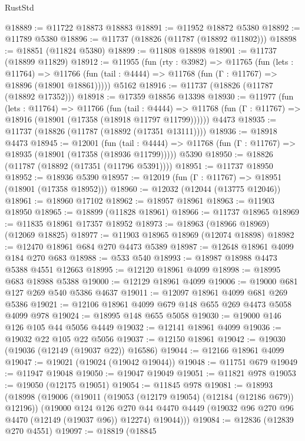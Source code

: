 \begin{lexlean}{RustStd}
\begin{coremodule}
@18889 := @11722 @18873 @18883
@18891 := @11952 @18872 @5380
@18892 := @11789 @5380
@18896 := @11737 (@18826 (@11787 (@18892 @11802)))
@18898 := @18851 (@11824 @5380)
@18899 := @11808 @18898
@18901 := @11737 (@18899 @11829)
@18912 := @11955
    (fun (rty : @3982) =>
    @11765
      (fun (lets : @11764) =>
      @11766 (fun (tail : @4444) => @11768 (fun (Γ : @11767) => @18896 (@18901 @18861)))))
    @5162
@18916 := @11737 (@18826 (@11787 (@18892 @17352)))
@18918 := @17359 @18856 @13398
@18930 := @11977
    (fun (lets : @11764) =>
    @11766
      (fun (tail : @4444) =>
      @11768 (fun (Γ : @11767) => @18916 (@18901 (@17358 (@18918 @11797 @11799))))))
    @4473
@18935 := @11737 (@18826 (@11787 (@18892 (@17351 @13111))))
@18936 := @18918 @4473
@18945 := @12001
    (fun (tail : @4444) => @11768 (fun (Γ : @11767) => @18935 (@18901 (@17358 (@18936 @11799)))))
    @5390
@18950 := @18826 (@11787 (@18892 (@17351 (@11796 @5391))))
@18951 := @11737 @18950
@18952 := @18936 @5390
@18957 := @12019 (fun (Γ : @11767) => @18951 (@18901 (@17358 @18952)))
@18960 := @12032 (@12044 (@13775 @12046))
@18961 := @18960 @17102
@18962 := @18957 @18961
@18963 := @11903 @18950
@18965 := @18899 (@11828 @18961)
@18966 := @11737 @18965
@18969 := @11835 @18961 @17357 @18952
@18973 := @18963 (@18966 @18969) (@12069 @18825)
@18977 := @11903 @18965 @18969 (@12074 @18898)
@18982 := @12470 @18961 @684 @270 @4473 @5389
@18987 := @12648 @18961 @4099 @184 @270 @683
@18988 := @533 @540
@18993 := @18987 @18988 @4473 @5388 @4551 @12663
@18995 := @12120 @18961 @4099
@18998 := @18995 @683 @18988 @5388
@19000 := @12129 @18961 @4099
@19006 := @19000 @681 @127 @269 @540 @5386 @4637
@19011 := @12097 @18961 @4099 @681 @269 @5386
@19021 := @12106 @18961 @4099 @679 @148 @655 @269 @4473 @5058 @4099 @978
@19024 := @18995 @148 @655 @5058
@19030 := @19000 @146 @126 @105 @44 @5056 @4449
@19032 := @12141 @18961 @4099
@19036 := @19032 @22 @105 @22 @5056
@19037 := @12150 @18961
@19042 := @19030 (@19036 (@12149 (@19037 @22)) @16586)
@19044 := @12166 @18961 @4099
@19047 := @19021 (@19024 (@19042 @19044))
@19048 := @11751 @679
@19049 := @11947 @19048
@19050 := @19047 @19049
@19051 := @11821 @978
@19053 := @19050 (@12175 @19051)
@19054 := @11845 @978
@19081 := @18993
    (@18998
      (@19006
        (@19011 (@19053 (@12179 @19054) (@12184 (@12186 @679)) @12196))
        (@19000
          @124
          @126
          @270
          @44
          @4470
          @4449
          (@19032 @96 @270 @96 @4470 (@12149 (@19037 @96)) @12274)
          @19044)))
@19084 := @12836 (@12839 @270 @4551)
@19097 := @18819
    (@18845

\end{coremodule}
\end{lexlean}
